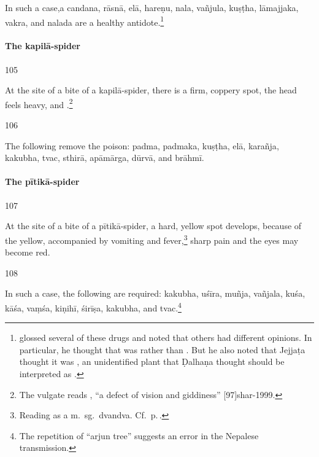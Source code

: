 \begin{translation}
In such a case,a
\gls{candana}, 
\gls{rāsnā}, 
\gls{elā}, 
\gls{hareṇu},
\gls{nala}, 
\gls{vañjula}, 
\gls{kuṣṭha}, 
\gls{lāmajjaka}, 
\gls{vakra},
and \gls{nalada} are a healthy
antidote.\footnote{ glossed several of these
    drugs and noted that others had different opinions.  In particular, he
    thought that  was  rather than
    . But he also noted that Jejjaṭa thought it was
    , an unidentified plant that Ḍalhaṇa thought should be
    interpreted as .}



\paragraph{The \Gls{kapilā-spider}}

\item[105]

At the site of a bite of a \Gls{kapilā-spider}, there is a firm, coppery spot, the 
head feels heavy, and .\footnote{The vulgate 
reads , “a defect of vision and giddiness” 
[97]{shar-1999}.}

\item[106]

The following remove the poison: 
\gls{padma},
\gls{padmaka},
\gls{kuṣṭha},
\gls{elā},
\gls{karañja},
\gls{kakubha},
\gls{tvac},
\gls{sthirā},
\gls{apāmārga},
\gls{dūrvā}, and
\gls{brāhmī}.



\paragraph{The \Gls{pītikā-spider}}

\item[107]

At the site of a bite of a \Gls{pītikā-spider}, a hard, yellow spot develops, 
because of the yellow, accompanied by vomiting and fever,\footnote{Reading 
 as a m.\ sg.\ dvandva. Cf.\ p.\,\pageref{masc-dvandva}.} 
sharp pain and the eyes may 
become red.

\item[108]

In such a case, the following are required:
\gls{kakubha},
\gls{uśīra},
\gls{muñja},
\gls{vañjala},
%
\gls{kuśa},
\gls{kāśa},
\gls{vaṃśa},
\gls{kiṇihī},
\gls{śirīṣa},
\gls{kakubha},
and 
\gls{tvac}.\footnote{The repetition of  “arjun tree” suggests an 
error in the Nepalese transmission.}


\end{translation}
